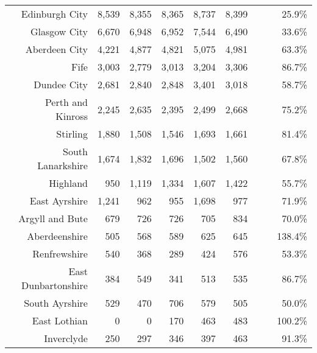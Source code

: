 \documentclass[
  12pt,
]{article}
\begin{document}
\begin{longtable}[t]{rrrrrrrrr}
\endfoot
\bottomrule
\endlastfoot
Edinburgh City & 8,539 & 8,355 & 8,365 & 8,737 & 8,399 & \cellcolor{white}{ -3.9\%} & \cellcolor{white}{ -0.4\%} & 25.9\%\\
Glasgow City & 6,670 & 6,948 & 6,952 & 7,544 & 6,490 & \cellcolor{white}{-14.0\%} & \cellcolor{white}{ -0.7\%} & 33.6\%\\
Aberdeen City & 4,221 & 4,877 & 4,821 & 5,075 & 4,981 & \cellcolor{white}{ -1.9\%} & \cellcolor{white}{  4.2\%} & 63.3\%\\
Fife & 3,003 & 2,779 & 3,013 & 3,204 & 3,306 & \cellcolor{white}{  3.2\%} & \cellcolor{white}{  2.4\%} & 86.7\%\\
Dundee City & 2,681 & 2,840 & 2,848 & 3,401 & 3,018 & \cellcolor{white}{-11.3\%} & \cellcolor{white}{  3.0\%} & 58.7\%\\
Perth and Kinross & 2,245 & 2,635 & 2,395 & 2,499 & 2,668 & \cellcolor{white}{  6.8\%} & \cellcolor{white}{  4.4\%} & 75.2\%\\
Stirling & 1,880 & 1,508 & 1,546 & 1,693 & 1,661 & \cellcolor{white}{ -1.9\%} & \cellcolor{white}{ -3.0\%} & 81.4\%\\
South Lanarkshire & 1,674 & 1,832 & 1,696 & 1,502 & 1,560 & \cellcolor{white}{  3.9\%} & \cellcolor{white}{ -1.7\%} & 67.8\%\\
Highland & 950 & 1,119 & 1,334 & 1,607 & 1,422 & \cellcolor{white}{-11.5\%} & \cellcolor{white}{ 10.6\%} & 55.7\%\\
East Ayrshire & 1,241 & 962 & 955 & 1,698 & 977 & \cellcolor{white}{-42.5\%} & \cellcolor{white}{ -5.8\%} & 71.9\%\\
Argyll and Bute & 679 & 726 & 726 & 705 & 834 & \cellcolor{white}{ 18.3\%} & \cellcolor{white}{  5.3\%} & 70.0\%\\
Aberdeenshire & 505 & 568 & 589 & 625 & 645 & \cellcolor{white}{  3.2\%} & \cellcolor{white}{  6.3\%} & 138.4\%\\
Renfrewshire & 540 & 368 & 289 & 424 & 576 & \cellcolor{white}{ 35.8\%} & \cellcolor{white}{  1.6\%} & 53.3\%\\
East Dunbartonshire & 384 & 549 & 341 & 513 & 535 & \cellcolor{white}{  4.3\%} & \cellcolor{white}{  8.6\%} & 86.7\%\\
South Ayrshire & 529 & 470 & 706 & 579 & 505 & \cellcolor{white}{-12.8\%} & \cellcolor{white}{ -1.2\%} & 50.0\%\\
East Lothian & 0 & 0 & 170 & 463 & 483 & \cellcolor{white}{  4.3\%} & \cellcolor{white}{} & 100.2\%\\
Inverclyde & 250 & 297 & 346 & 397 & 463 & \cellcolor{white}{ 16.6\%} & \cellcolor{white}{ 16.7\%} & 91.3\%\\

\end{longtable}
\end{document}
